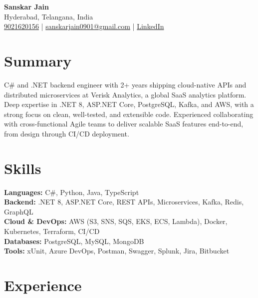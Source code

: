 \documentclass[a4paper,10pt]{article}
\begin{document}
\begin{center}
    {\LARGE \textbf{Sanskar Jain}} \\
    Hyderabad, Telangana, India \\
    \href{tel:9021620156}{9021620156} \;|\;
    \href{mailto:sanskarjain0901@gmail.com}{sanskarjain0901@gmail.com} \;|\;
    \href{https://www.linkedin.com/in/sanskar-jain0901/}{LinkedIn}
\end{center}

\vspace{3pt}

\section*{Summary}
C\# and .NET backend engineer with 2+ years shipping cloud-native APIs and distributed microservices at Verisk Analytics, a global SaaS analytics platform.
Deep expertise in .NET 8, ASP.NET Core, PostgreSQL, Kafka, and AWS, with a strong focus on clean, well-tested, and extensible code.
Experienced collaborating with cross-functional Agile teams to deliver scalable SaaS features end-to-end, from design through CI/CD deployment.

\section*{Skills}
\textbf{Languages:} C\#, Python, Java, TypeScript \\
\textbf{Backend:} .NET 8, ASP.NET Core, REST APIs, Microservices, Kafka, Redis, GraphQL \\
\textbf{Cloud \& DevOps:} AWS (S3, SNS, SQS, EKS, ECS, Lambda), Docker, Kubernetes, Terraform, CI/CD \\
\textbf{Databases:} PostgreSQL, MySQL, MongoDB \\
\textbf{Tools:} xUnit, Azure DevOps, Postman, Swagger, Splunk, Jira, Bitbucket

\section*{Experience}
\end{document}
